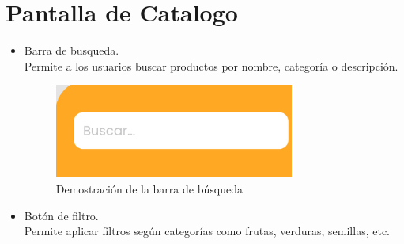 \documentclass[11pt, a4paper, oneside]{book}
\begin{document}
\section{Pantalla de Catalogo}
\begin{itemize}
\item Barra de busqueda.\\
Permite a los usuarios buscar productos por nombre, categoría o descripción.
\begin{figure}[H]
    \centering
    \includegraphics[width=0.5
    \linewidth]{Pictures/BarraBusqueda.png  }
            \caption{Demostración de la barra de búsqueda}
\end{figure}

\item Botón de filtro.\\
Permite aplicar filtros según categorías como frutas, verduras, semillas, etc.


\end{itemize}
\end{document}
